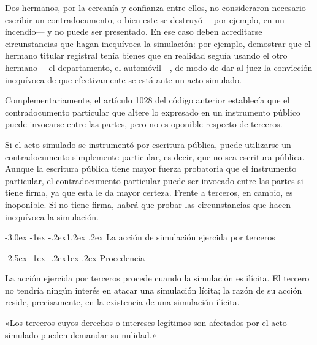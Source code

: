 \documentclass[12pt,oneside]{book}
\makeatletter
\renewcommand\section{\@startsection{section}{1}{\z@}%
  {-3.0ex \@plus -1ex \@minus -.2ex}{1.2ex \@plus .2ex}%
  {\normalfont\large\bfseries\color{acento}}}
\renewcommand\subsection{\@startsection{subsection}{2}{\z@}%
  {-2.5ex \@plus -1ex \@minus -.2ex}{1ex \@plus .2ex}%
  {\normalfont\normalsize\bfseries}}
\makeatother
\begin{document}
\begin{ejemplo}
Dos hermanos, por la cercanía y confianza entre ellos, no consideraron necesario escribir un contradocumento, o bien este se destruyó ---por ejemplo, en un incendio--- y no puede ser presentado. En ese caso deben acreditarse circunstancias que hagan inequívoca la simulación: por ejemplo, demostrar que el hermano titular registral tenía bienes que en realidad seguía usando el otro hermano ---el departamento, el automóvil---, de modo de dar al juez la convicción inequívoca de que efectivamente se está ante un acto simulado.
\end{ejemplo}

Complementariamente, el artículo 1028 del código anterior establecía que el contradocumento particular que altere lo expresado en un instrumento público puede invocarse entre las partes, pero no es oponible respecto de terceros.

\begin{importante}
Si el acto simulado se instrumentó por escritura pública, puede utilizarse un contradocumento simplemente particular, es decir, que no sea escritura pública. Aunque la escritura pública tiene mayor fuerza probatoria que el instrumento particular, el contradocumento particular puede ser invocado entre las partes si tiene firma, ya que esta le da mayor certeza. Frente a terceros, en cambio, es inoponible. Si no tiene firma, habrá que probar las circunstancias que hacen inequívoca la simulación.
\end{importante}

\section{La acción de simulación ejercida por terceros}

\subsection{Procedencia}

La acción ejercida por terceros procede cuando la simulación es ilícita. El tercero no tendría ningún interés en atacar una simulación lícita; la razón de su acción reside, precisamente, en la existencia de una simulación ilícita.

\begin{regla}
«Los terceros cuyos derechos o intereses legítimos son afectados por el acto simulado pueden demandar su nulidad.»
\end{regla}
\end{document}
